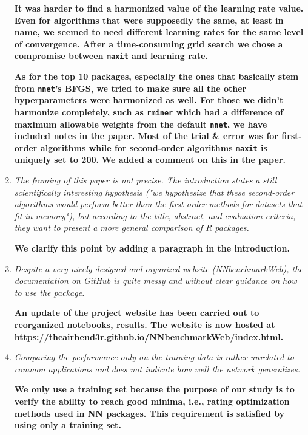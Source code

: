\documentclass[12pt]{article}
\newcommand{\code}{\texttt}
\begin{document}
\begin{enumerate}
\textbf{It was harder to find a harmonized value of the learning rate value. 
Even for algorithms that were supposedly the same, at least in name, we seemed to need
different learning rates for the same level of convergence. 
After a time-consuming grid search we chose a compromise between \code{maxit} and learning rate.}

\textbf{As for the top 10 packages, especially the ones that basically stem from \code{nnet}'s BFGS, we tried to make sure all the other hyperparameters 
were harmonized as well. 
For those we didn't harmonize completely, such as \code{rminer} which had a difference of
maximum allowable weights from the default \code{nnet}, 
we have included notes in the paper. 
Most of the trial \& error was for first-order algorithms while for second-order algorithms \code{maxit} is uniquely set to 200. }
\textbf{We added a comment on this in the paper.}


\item \textit{The framing of this paper is not precise. The introduction states a still scientifically interesting hypothesis ("we hypothesize that these second-order algorithms would perform better than the first-order methods for datasets that fit in memory"), but according to the title, abstract, and evaluation criteria, they want to present a more general comparison of R packages.}

\textbf{We clarify this point by adding a paragraph in the introduction.}



\item \textit{Despite a very nicely designed and organized website (NNbenchmarkWeb), the documentation on GitHub is quite messy and without clear guidance on how to use the package.}

\textbf{An update of the project website has been carried out to reorganized notebooks, results.
The website is now hosted at \url{https://theairbend3r.github.io/NNbenchmarkWeb/index.html}.}



\item \textit{Comparing the performance only on the training data is rather unrelated to common applications and does not indicate how well the network generalizes.}

\textbf{We only use a training set because the purpose of our study is to verify the ability to reach good minima, i.e., rating optimization
methods used in NN packages. This requirement is satisfied by using only a training set.}


\end{enumerate}
\end{document}
